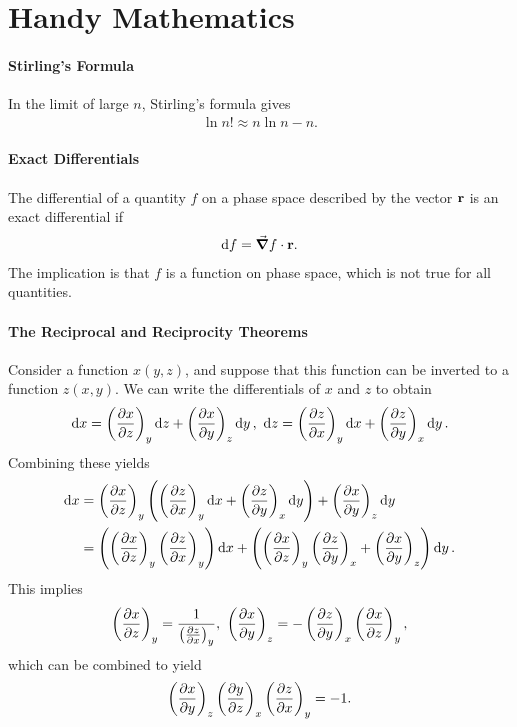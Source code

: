 \section{Handy Mathematics}

\paragraph{Stirling's Formula}
In the limit of large $n$, Stirling's formula gives
\begin{align*}
	\ln{n!}\approx n\ln{n} - n.
\end{align*}

\paragraph{Exact Differentials}
The differential of a quantity $f$ on a phase space described by the vector $\vb{r}$ is an exact differential if
\begin{align*}
	\dd{f} = \grad{f}\cdot\vb{r}.
\end{align*}
The implication is that $f$ is a function on phase space, which is not true for all quantities.

\paragraph{The Reciprocal and Reciprocity Theorems}
Consider a function $x(y, z)$, and suppose that this function can be inverted to a function $z(x, y)$. We can write the differentials of $x$ and $z$ to obtain
\begin{align*}
	\dd{x} = \fix{\pdv{x}{z}}{y}\dd{z} + \fix{\pdv{x}{y}}{z}\dd{y},\ \dd{z} = \fix{\pdv{z}{x}}{y}\dd{x} + \fix{\pdv{z}{y}}{x}\dd{y}.
\end{align*}
Combining these yields
\begin{align*}
	\dd{x} &= \left(\pdv{x}{z}\right)_{y}\left(\left(\pdv{z}{x}\right)_{y}\dd{x} + \left(\pdv{z}{y}\right)_{x}\dd{y}\right) + \left(\pdv{x}{y}\right)_{z}\dd{y} \\
	       &= \left(\left(\pdv{x}{z}\right)_{y}\left(\pdv{z}{x}\right)_{y}\right)\dd{x} + \left(\left(\pdv{x}{z}\right)_{y}\left(\pdv{z}{y}\right)_{x} + \left(\pdv{x}{y}\right)_{z}\right)\dd{y}.
\end{align*}
This implies
\begin{align*}
	\fix{\pdv{x}{z}}{y} = \frac{1}{\fix{\pdv{z}{x}}{y}},\ \fix{\pdv{x}{y}}{z} = -\fix{\pdv{z}{y}}{x}\fix{\pdv{x}{z}}{y},
\end{align*}
which can be combined to yield
\begin{align*}
	 \left(\pdv{x}{y}\right)_{z}\left(\pdv{y}{z}\right)_{x}\left(\pdv{z}{x}\right)_{y} = -1.
\end{align*}

